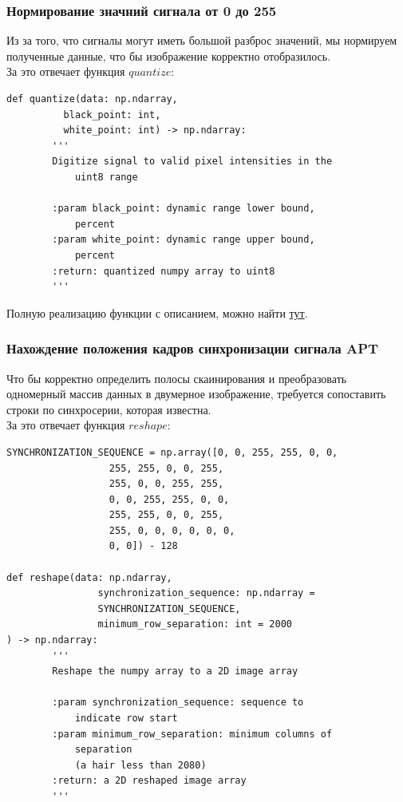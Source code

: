 \documentclass[a4paper, 14pt, titlepage, fleqn]{extarticle}
\begin{document}
	\pagebreak
	\subsubsection*{Нормирование значний сигнала от 0 до 255}
	
	Из за того, что сигналы могут иметь большой разброс значений, мы нормируем полученные данные, что бы изображение корректно отобразилось. \\
	
	\noindent За это отвечает функция $quantize$:
	
	\begin{verbatim}
def quantize(data: np.ndarray, 
	      black_point: int, 
	      white_point: int) -> np.ndarray:
        '''
        Digitize signal to valid pixel intensities in the 
        	uint8 range

        :param black_point: dynamic range lower bound, 
        	percent
        :param white_point: dynamic range upper bound, 
        	percent
        :return: quantized numpy array to uint8
        '''
	\end{verbatim}
	
	\noindent Полную реализацию функции с описанием, можно найти \href{https://github.com/kitfloppa/sdr-sat-receiving/blob/main/script_noaa_decoder.py#L84}{тут}. \\
	
	\pagebreak
	\subsubsection*{Нахождение положения кадров синхронизации сигнала APT}
	
	Что бы корректно определить полосы скаинирования и преобразовать одномерный массив данных в двумерное изображение, требуется сопоставить строки по синхросерии, которая известна. \\
	
	\noindent За это отвечает функция $reshape$:
	
	\begin{verbatim}
SYNCHRONIZATION_SEQUENCE = np.array([0, 0, 255, 255, 0, 0, 
				  255, 255, 0, 0, 255, 
				  255, 0, 0, 255, 255,
				  0, 0, 255, 255, 0, 0, 
				  255, 255, 0, 0, 255, 
				  255, 0, 0, 0, 0, 0, 0, 
				  0, 0]) - 128	
	
def reshape(data: np.ndarray,
                synchronization_sequence: np.ndarray =
                SYNCHRONIZATION_SEQUENCE,
                minimum_row_separation: int = 2000
) -> np.ndarray:
        '''
        Reshape the numpy array to a 2D image array

        :param synchronization_sequence: sequence to 
        	indicate row start
        :param minimum_row_separation: minimum columns of 
        	separation
            (a hair less than 2080)
        :return: a 2D reshaped image array
        '''
	\end{verbatim}
	
\end{document}
